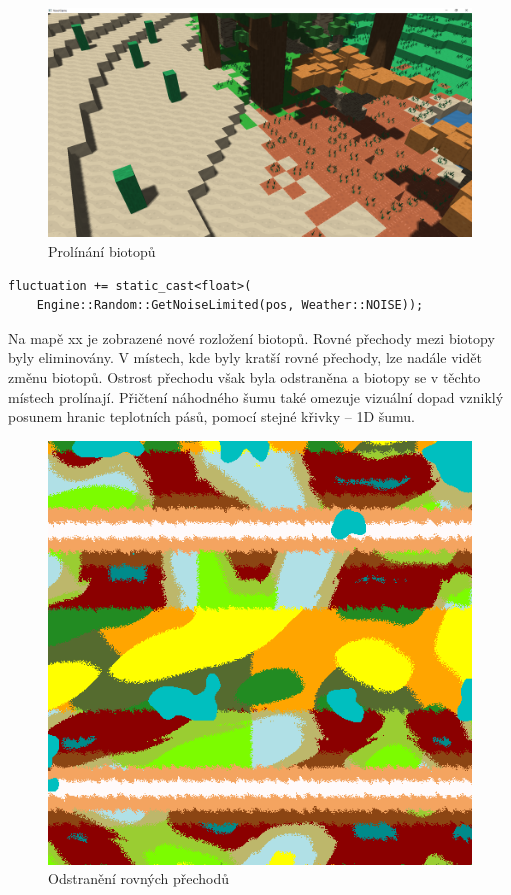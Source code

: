 \documentclass[thesis=M,czech]{FITthesis}[2019/12/23]
\begin{document}
\begin{figure}\centering
	\includegraphics[width=\textwidth]{images/world_gen/fuzzy_trans}
	\caption[Prolínání biotopů]{Prolínání biotopů}\label{fig:fuzzy_trans}
\end{figure}

\begin{verbatim}
fluctuation += static_cast<float>(
    Engine::Random::GetNoiseLimited(pos, Weather::NOISE));
\end{verbatim}

Na mapě xx je zobrazené nové rozložení biotopů. Rovné přechody mezi biotopy byly eliminovány. V místech, kde byly kratší rovné přechody, lze nadále vidět změnu biotopů. Ostrost přechodu však byla odstraněna a biotopy se v těchto místech prolínají. Přičtení náhodného šumu také omezuje vizuální dopad vzniklý posunem hranic teplotních pásů, pomocí stejné křivky – 1D šumu.

\begin{figure}\centering
	\includegraphics[width=\textwidth]{images/world_gen/biomes_new}
	\caption[Odstranění rovných přechodů]{Odstranění rovných přechodů}\label{fig:biomes_new}
\end{figure}
\end{document}
